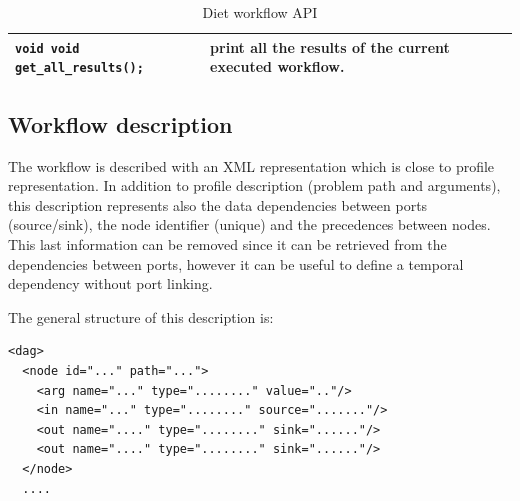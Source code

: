 \begin{table}[htbp]
\begin{tabular}[htbp]{|p{8cm}|p{7.5cm}|}
    \texttt{void \newline
      void get\_all\_results();}
    &
    print all the results of the current executed workflow.
    \\\hline
  \end{tabular}
  \caption{Diet workflow API}
  \label{tab::wf_api}
\end{table}


\subsection{Workflow description}
\label{sec:workflow_desc}

The workflow is described with an XML representation which is close
to \diet profile representation. In addition to profile description
(problem path and arguments), this description represents also the
data dependencies between ports (source/sink), the node identifier
(unique) and the precedences between nodes. This last information can
be removed since it can be retrieved from the dependencies between
ports, however it can be useful to define a temporal dependency
without port linking.

The general structure of this description is:

\begin{verbatim}
<dag>
  <node id="..." path="...">
    <arg name="..." type="........" value=".."/>
    <in name="..." type="........" source="......."/>
    <out name="...." type="........" sink="......"/>
    <out name="...." type="........" sink="......"/>
  </node>
  ....
\end{verbatim}

